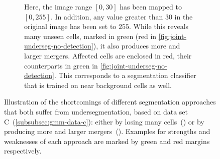 \begin{figure}
\begin{subfigure}[t]{0.48\textwidth}
        \caption{Here, the image range $[0, 30]$ has been mapped to $[0, 255]$. In addition, any
            value greater than $30$ in the original image has been set to $255$. While this reveals
            many unseen cells, marked in green (red in \cref{fig:joint-underseg-no-detection}),
            it also produces more and larger mergers. Affected cells are enclosed in red, their
            counterparts in green in \cref{fig:joint-underseg-no-detection}. This
            corresponds to a segmentation classifier that is trained on near background cells as
            well. }
        \label{fig:joint-underseg-mergers}
    \end{subfigure}
    \caption[Undersegmentation in different segmentation approaches]{Illustration of the
        shortcomings of different segmentation approaches that both suffer from undersegmentation,
        based on data set C~(\cref{subsubsec:gmm-data-c}): either by losing many
        cells~() or by producing more and larger
        mergers~(). Examples for strengths and weaknesses of each
        approach are marked by green and red margins respectively.}
    \label{fig:joint-motivation-example}
\end{figure}








